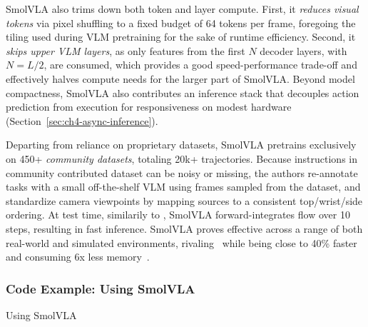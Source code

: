 SmolVLA also trims down both token and layer compute.
First, it \emph{reduces visual tokens} via pixel shuffling to a fixed budget of 64 tokens per frame, foregoing the tiling used during VLM pretraining for the sake of runtime efficiency. 
Second, it \emph{skips upper VLM layers}, as only features from the first \(N\) decoder layers, with \(N=L/2\), are consumed, which provides a good speed-performance trade-off and effectively halves compute needs for the larger part of SmolVLA.
Beyond model compactness, SmolVLA also contributes an inference stack that decouples action prediction from execution for responsiveness on modest hardware (Section~\ref{sec:ch4-async-inference}).

Departing from reliance on proprietary datasets, SmolVLA pretrains exclusively on 450+ \emph{community datasets}, totaling 20k+ trajectories. 
Because instructions in community contributed dataset can be noisy or missing, the authors re-annotate tasks with a small off-the-shelf VLM using frames sampled from the dataset, and standardize camera viewpoints by mapping sources to a consistent top/wrist/side ordering.
At test time, similarily to \pizero, SmolVLA forward-integrates flow over 10 steps, resulting in fast inference.
SmolVLA proves effective across a range of both real-world and simulated environments, rivaling \pizero~while being close to 40\% faster and consuming 6x less memory~\citep{shukorSmolVLAVisionLanguageActionModel2025}.

\subsubsection{Code Example: Using SmolVLA}
\begin{pbox}[label={ex:using-pizero}]{Using SmolVLA}
    \inputminted{python}{snippets/ch5/02_using_smolvla.py}
\end{pbox}

